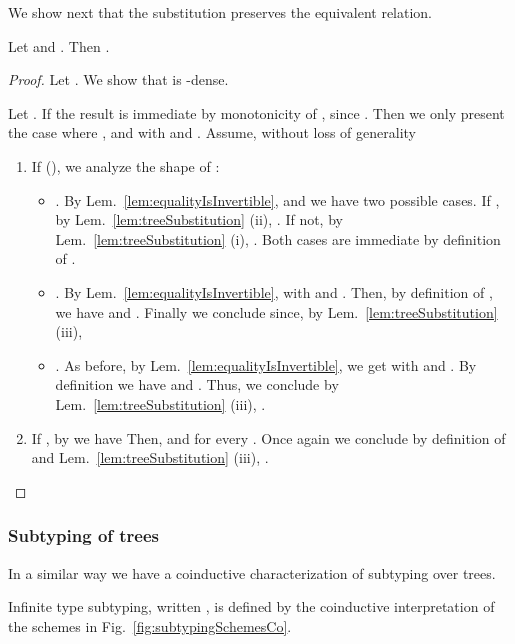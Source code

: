 We show next that the substitution preserves the equivalent relation.

\begin{lemma}
\label{lem:substitutionOfEqtypesCo}
Let  and . Then
.
\end{lemma}

\begin{proof}
Let . We show that  is -dense.

Let . If  the result is immediate by monotonicity of
, since . Then we only present the case where
,  and  with  and .
Assume, without loss of generality 

\begin{enumerate}
  \item If  (\ie ), we analyze the shape
  of :
  \begin{itemize}
    \item . By Lem.~\ref{lem:equalityIsInvertible},  and we
    have two possible cases. If , by Lem.~\ref{lem:treeSubstitution}
    (ii), . If not, by Lem.~\ref{lem:treeSubstitution} (i),
    . Both cases are immediate by definition
    of .
    
    \item . By
    Lem.~\ref{lem:equalityIsInvertible},  with
     and . Then, by definition of
    , we have 
    and . Finally we conclude  since, by
    Lem.~\ref{lem:treeSubstitution} (iii), 

    \item . As before, by
    Lem.~\ref{lem:equalityIsInvertible}, we get  with  and . By definition  we have
     and
    . Thus, we conclude by
    Lem.~\ref{lem:treeSubstitution} (iii), .
  \end{itemize}
  
  \item If , by  we have  Then,
   and
   for every . Once again we
  conclude by definition of  and Lem.~\ref{lem:treeSubstitution}
  (iii), .
\end{enumerate}
\end{proof}


\subsubsection{Subtyping of trees}


In a similar way we have a coinductive characterization of subtyping over trees.

\begin{definition}
Infinite type subtyping, written , is defined by the coinductive
interpretation of the schemes in Fig.~\ref{fig:subtypingSchemesCo}. 
\end{definition}

